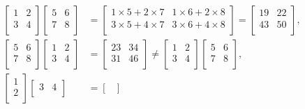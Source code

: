 \documentclass[../main.tex]{subfiles}
\begin{document}
\begin{example}
	\begin{align}
		\begin{bmatrix}
		1&2\\
		3&4\\
		\end{bmatrix}
		\begin{bmatrix}
		5&6\\
		7&8\\
		\end{bmatrix} &=
		\begin{bmatrix}
		1 \times 5 + 2 \times 7&1 \times 6 + 2 \times 8\\
		3 \times 5 + 4 \times 7&3 \times 6 + 4 \times 8\\
		\end{bmatrix} =
		\begin{bmatrix}
		19 & 22 \\
		43 & 50 \\
		\end{bmatrix}, \nonumber \\
		\begin{bmatrix}
		5&6\\
		7&8\\
		\end{bmatrix}
		\begin{bmatrix}
		1&2\\
		3&4\\
		\end{bmatrix} &=
		\begin{bmatrix}
		23 & 34 \\
		31 & 46 \\
		\end{bmatrix} \neq
		\begin{bmatrix}
		1&2\\
		3&4\\
		\end{bmatrix}
		\begin{bmatrix}
		5&6\\
		7&8\\
		\end{bmatrix}, \nonumber \\
		\begin{bmatrix}
		1\\2\\
		\end{bmatrix}
		\begin{bmatrix}
		3&4\\
		\end{bmatrix} &=
		\begin{bmatrix}

\end{bmatrix}
\end{align}
\end{example}
\end{document}
